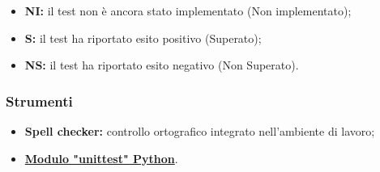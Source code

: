 \begin{itemize}
    \item \textbf{NI:} 
        il test non è ancora stato implementato (Non implementato);
    \item \textbf{S:} 
        il test ha riportato esito positivo (Superato);
    \item \textbf{NS:}
        il test ha riportato esito negativo (Non Superato).
\end{itemize}

\hypertarget{subsubsec:strumentiVerifica}{\subsubsection{Strumenti}}
\begin{itemize}
    \item \textbf{Spell checker:} 
        controllo ortografico integrato nell’ambiente di lavoro;
    \item \href{https://docs.python.org/3/library/unittest.html}{\textbf{Modulo "unittest" Python}}.
\end{itemize}